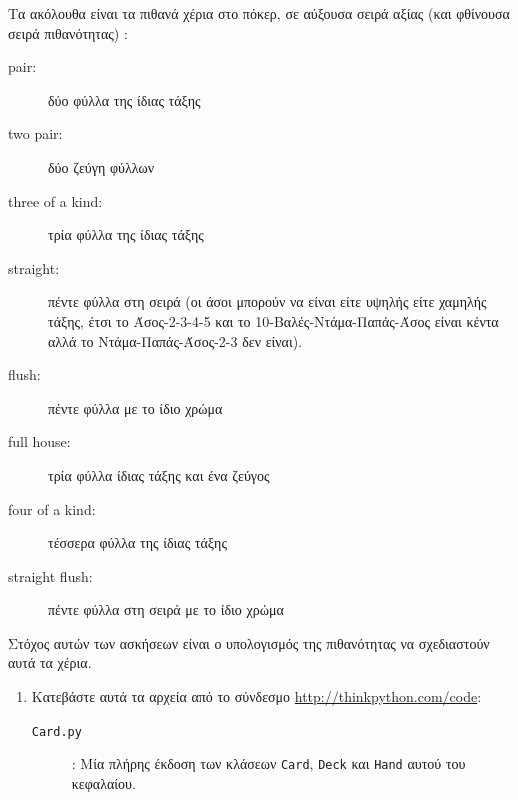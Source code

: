 \documentclass[10pt]{book}
\begin{document}
\begin{exercise}
\label{poker}

Τα ακόλουθα είναι τα πιθανά χέρια στο πόκερ, σε αύξουσα σειρά αξίας (και φθίνουσα 
σειρά πιθανότητας) :

\begin{description}

\item[pair:]  δύο φύλλα της ίδιας τάξης 
\vspace{-0.05in}

\item[two pair:]  δύο ζεύγη φύλλων 
\vspace{-0.05in}

\item[three of a kind:]  τρία φύλλα της ίδιας τάξης 
\vspace{-0.05in}

\item[straight:]  πέντε φύλλα στη σειρά (οι άσοι μπορούν να είναι είτε υψηλής είτε χαμηλής τάξης, έτσι το Άσος-2-3-4-5 και το 10-Βαλές-Ντάμα-Παπάς-Άσος είναι κέντα αλλά το Ντάμα-Παπάς-Άσος-2-3 δεν είναι). 
\vspace{-0.05in}

\item[flush:]  πέντε φύλλα με το ίδιο χρώμα 
\vspace{-0.05in}

\item[full house:]  τρία φύλλα ίδιας τάξης και ένα ζεύγος 
\vspace{-0.05in}

\item[four of a kind:]  τέσσερα φύλλα της ίδιας τάξης 
\vspace{-0.05in}

\item[straight flush:]  πέντε φύλλα στη σειρά με το ίδιο χρώμα 
\vspace{-0.05in}

\end{description}
%
 Στόχος αυτών των ασκήσεων είναι ο υπολογισμός της πιθανότητας να σχεδιαστούν 
αυτά τα χέρια.

\begin{enumerate}

\item Κατεβάστε αυτά τα αρχεία από το σύνδεσμο  \url{http://thinkpython.com/code}:

\begin{description}

\item[{\tt Card.py}]:  Μία πλήρης έκδοση των κλάσεων  {\tt Card}, {\tt Deck}  
και  {\tt Hand}  αυτού του κεφαλαίου. 


\end{description}
\end{enumerate}
\end{exercise}
\end{document}
